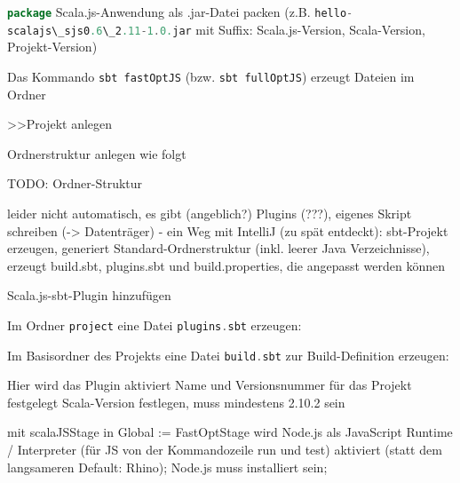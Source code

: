 \documentclass[a4paper, 12pt, hidelinks, listof=totoc, listoftables=totoc, bibliography=totoc]{scrreprt}
\newcommand{\code}[1]{\lstinline[language=Scala, style=inline]|#1|}
\begin{document}
\code{package} Scala.js-Anwendung als .jar-Datei packen (z.B. \code{hello-scalajs\_sjs0.6\_2.11-1.0.jar} mit Suffix: Scala.js-Version, Scala-Version, Projekt-Version)






Das Kommando \code{sbt fastOptJS} (bzw. \code{sbt fullOptJS}) erzeugt Dateien im Ordner
















>>Projekt anlegen


Ordnerstruktur anlegen wie folgt

TODO: Ordner-Struktur

leider nicht automatisch, es gibt (angeblich?) Plugins (???), eigenes Skript schreiben (-> Datenträger)
	- ein Weg mit IntelliJ (zu spät entdeckt): sbt-Projekt erzeugen, generiert Standard-Ordnerstruktur (inkl. leerer Java Verzeichnisse), erzeugt build.sbt, plugins.sbt und build.properties, die angepasst werden können


Scala.js-sbt-Plugin hinzufügen

Im Ordner \code{project} eine Datei \code{plugins.sbt} erzeugen:


Im Basisordner des Projekts eine Datei \code{build.sbt} zur Build-Definition erzeugen:


Hier wird das Plugin aktiviert
Name und Versionsnummer für das Projekt festgelegt
Scala-Version festlegen, muss mindestens 2.10.2 sein

mit scalaJSStage in Global := FastOptStage wird Node.js als JavaScript Runtime / Interpreter (für JS von der Kommandozeile run und test) aktiviert (statt dem langsameren Default: Rhino); Node.js muss installiert sein;
\end{document}
